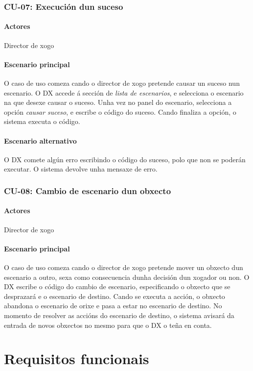 \subsubsection{CU-07: Execución dun suceso}
\paragraph{Actores}
Director de xogo
\paragraph{Escenario principal}
O caso de uso comeza cando o director de xogo pretende causar un suceso nun
escenario. O DX accede á sección de {\it lista de escenarios}, e selecciona o
escenario na que desexe causar o suceso. Unha vez no panel do escenario,
selecciona a opción {\it causar suceso}, e escribe o código do suceso. Cando
finaliza a opción, o sistema executa o código.

\paragraph{Escenario alternativo}
O DX comete algún erro escribindo o código do suceso, polo que non se poderán
executar. O sistema devolve unha mensaxe de erro.

\subsubsection{CU-08: Cambio de escenario dun obxecto}
\paragraph{Actores}
Director de xogo
\paragraph{Escenario principal}
O caso de uso comeza cando o director de xogo pretende mover un obxecto dun
escenario a outro, sexa como consecuencia dunha decisión dun xogador ou non. O
DX escribe o código do cambio de escenario, especificando o obxecto que se
desprazará e o escenario de destino. Cando se executa a acción, o obxecto
abandona o escenario de orixe e pasa a estar no escenario de destino. No momento
de resolver as accións do escenario de destino, o sistema avisará da entrada de
novos obxectos no mesmo para que o DX o teña en conta.


\section{Requisitos funcionais}
